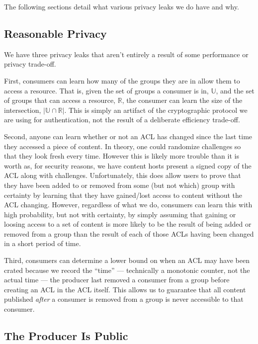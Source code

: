 \documentclass[pdftex,12pt,a4papaer,twoside,notitlepage]{report}
\begin{document}
The following sections detail what various privacy leaks we do have and why.

\subsection{Reasonable Privacy}
\label{sub:resonable_privacy}

We have three privacy leaks that aren't entirely a result of some performance or
privacy trade-off.

First, consumers can learn how many of the groups they are in allow them to
access a resource. That is, given the set of groups a consumer is in,
$\mathbb{U}$, and the set of groups that can access a resource, $\mathbb{R}$,
the consumer can learn the size of the intersection, $|\mathbb{U} \cap
\mathbb{R}|$. This is simply an artifact of the cryptographic protocol we are
using for authentication, not the result of a deliberate efficiency trade-off.

Second, anyone can learn whether or not an ACL has changed since the last time
they accessed a piece of content. In theory, one could randomize challenges so
that they look fresh every time. However this is likely more trouble than it is
worth as, for security reasons, we have content hosts present a signed copy of
the ACL along with challenges. Unfortunately, this does allow users to prove
that they have been added to or removed from some (but not which) group with
certainty by learning that they have gained/lost access to content without the
ACL changing. However, regardless of what we do, consumers can learn this with
high probability, but not with certainty, by simply assuming that gaining or
loosing access to a set of content is more likely to be the result of being
added or removed from a group than the result of each of those ACLs having been
changed in a short period of time.

Third, consumers can determine a lower bound on when an ACL may have been crated
because we record the ``time'' --- technically a monotonic counter, not the
actual time --- the producer last removed a consumer from a group before creating
an ACL in the ACL itself. This allows us to guarantee that all content published
\emph{after} a consumer is removed from a group is never accessible to that
consumer.

\subsection{The Producer Is Public}
\end{document}
